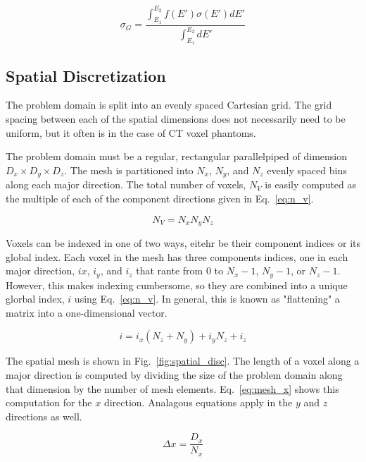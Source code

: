 \begin{equation}\label{eq:groupxs}
\sigma_G = \frac{\int_{E_1}^{E_2}f(E')\sigma(E') dE'}{\int_{E_1}^{E_2} dE'}
\end{equation}

\subsection{Spatial Discretization}

The problem domain is split into an evenly spaced Cartesian grid. The grid spacing between each of the spatial dimensions does not necessarily need to be uniform, but it often is in the case of CT voxel phantoms.

The problem domain must be a regular, rectangular parallelpiped of dimension $D_x \times D_y \times D_z$. The mesh is partitioned into $N_x$, $N_y$, and $N_z$ evenly spaced bins along each major direction. The total number of voxels, $N_V$ is easily computed as the multiple of each of the component directions given in Eq.~\ref{eq:n_v}.

\begin{equation} \label{eq:n_v}
	N_V = N_x N_y N_z
\end{equation}

Voxels can be indexed in one of two ways, eitehr be their component indices or its global index. Each voxel in the mesh has three components indices, one in each major direction, $ix$, $i_y$, and $i_z$ that rante from 0 to $N_x - 1$, $N_y - 1$, or $N_z-1$. However, this makes indexing cumbersome, so they are combined into a unique glorbal index, $i$ using Eq.~\ref{eq:n_v}. In general, this is known as "flattening" a matrix into a one-dimensional vector.

\begin{equation} \label{eq:indx_flat}
	i = i_x (N_z + N_y) + i_y N_z + i_z
\end{equation}

The spatial mesh is shown in Fig.~\ref{fig:spatial_disc}. The length of a voxel along a major direction is computed by dividing the size of the problem domain along that dimension by the number of mesh elements. Eq.~\ref{eq:mesh_x} shows this computation for the $x$ direction. Analagous equations apply in the $y$ and $z$ directions as well.

\begin{equation} \label{eq:mesh_x}
\Delta x = \frac{D_x}{N_x}
\end{equation}

